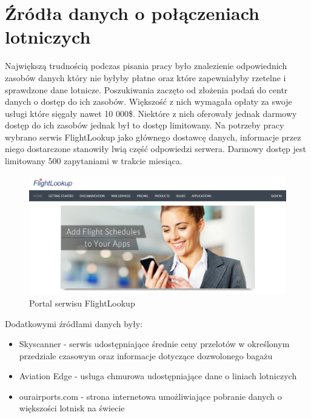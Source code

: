 \documentclass[12pt, twoside]{report}
\begin{document}
\section{Źródła danych o połączeniach lotniczych}
Największą trudnością podczas pisania pracy było znalezienie odpowiednich zasobów danych który nie byłyby płatne oraz które zapewniałyby rzetelne i sprawdzone dane lotnicze. Poszukiwania zaczęto od złożenia podań do centr danych o dostęp do ich zasobów. Większość z nich wymagała opłaty za swoje usługi które sięgały nawet 10 000\$. Niektóre z nich oferowały jednak darmowy dostęp do ich zasobów jednak był to dostęp limitowany. Na potrzeby pracy wybrano serwis FlightLookup jako głównego dostawcę danych, informacje przez niego dostarczone stanowiły lwią część odpowiedzi serwera. Darmowy dostęp jest limitowany 500 zapytaniami w trakcie miesiąca.
\vspace{1.0cm}
\begin{figure}[!ht]
\centering
\includegraphics[scale=0.4, keepaspectratio]{flightlookup.png}
\caption{Portal serwisu FlightLookup}
\label{fig:flightlookup}
\end{figure}
\newpage
Dodatkowymi źródłami danych były:
\begin{itemize}[noitemsep,topsep=0pt]
\item Skyscanner - serwis udostępniające średnie ceny przelotów w określonym przedziale czasowym oraz informacje dotyczące dozwolonego bagażu
\item Aviation Edge - usługa chmurowa udostępniające dane o liniach lotniczych 
\item ourairports.com - strona internetowa umożliwiające pobranie danych o większości lotnisk na świecie
\end{itemize}
\end{document}
